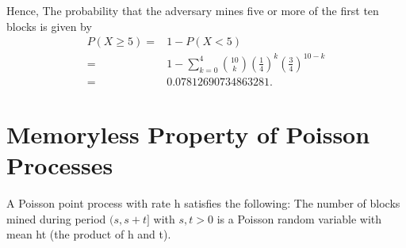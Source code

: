 \documentclass{article}
\begin{document}
Hence, The probability that the adversary mines five or more of the first ten blocks is given by
\begin{equation}
    \begin{aligned}
    P(X \geq 5) = & 1 - P(X < 5) \\
                = & 1 - \sum_{k=0}^{4} \binom{10}{k} \left(\frac{1}{4}\right)^k \left(\frac{3}{4}\right)^{10-k} \\
                = & 0.07812690734863281.
    \end{aligned}
\end{equation}

\section{Memoryless Property of Poisson Processes}
A Poisson point process with rate h satisfies the following:  The number of blocks mined during period $(s,s+t]$ with $s,t > 0$ is a Poisson random variable with mean ht (the product of h and t).
\end{document}
